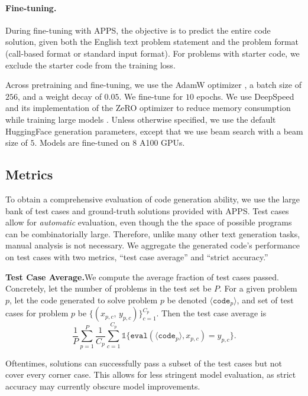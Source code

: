 \paragraph{Fine-tuning.}
During fine-tuning with APPS, the objective is to predict the entire code solution, given both the English text problem statement and the problem format (call-based format or standard input format). For problems with starter code, we exclude the starter code from the training loss.


Across pretraining and fine-tuning, we use the AdamW optimizer \citep{Loshchilov2019DecoupledWD}, a batch size of $256$, and a weight decay of $0.05$. We fine-tune for $10$ epochs. We use DeepSpeed and its implementation of the ZeRO optimizer to reduce memory consumption while training large models \citep{Rasley2020DeepSpeedSO, rajbhandari2020zero}. Unless otherwise specified, we use the default HuggingFace generation parameters, except that we use beam search with a beam size of $5$. Models are fine-tuned on 8 A100 GPUs.


\subsection{Metrics}
To obtain a comprehensive evaluation of code generation ability, we use the large bank of test cases and ground-truth solutions provided with APPS. Test cases allow for \emph{automatic} evaluation, even though the the space of possible programs can be combinatorially large. Therefore, unlike many other text generation tasks, manual analysis is not necessary. We aggregate the generated code's performance on test cases with two metrics, ``test case average'' and ``strict accuracy.'' %

\textbf{Test Case Average.}\quad We compute the average fraction of test cases passed. 
Concretely, let the number of problems in the test set be $P$. For a given problem $p$, let the code generated to solve problem $p$ be denoted $\langle\texttt{code}_p\rangle$, and set of test cases for problem $p$ be $\{(x_{p,c},\, y_{p,c})\}_{c=1}^{C_p}$. Then the test case average is 
\[
\frac{1}{P}\sum_{p=1}^P \frac{1}{C_p} \sum_{c=1}^{C_p} \mathds{1}\{\texttt{eval}(\langle\texttt{code}_p\rangle,x_{p,c}) = y_{p,c}\}.
\]

Oftentimes, solutions can successfully pass a subset of the test cases but not cover every corner case. This allows for less stringent model evaluation, as strict accuracy may currently obscure model improvements.

